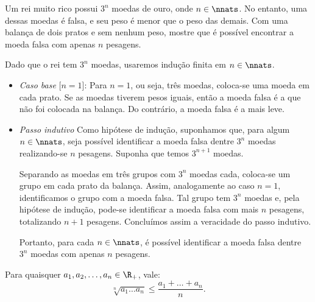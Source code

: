 \begin{example}
Um rei muito rico possui $3^n$ moedas de ouro, onde $n \in \nnats$. No entanto, uma dessas moedas é falsa, e seu peso é menor que o peso das demais. Com uma balança de dois pratos e sem nenhum peso, mostre que é possível encontrar a moeda falsa com apenas $n$ pesagens.
\end{example}

\begin{solution}
Dado que o rei tem $3^n$ moedas, usaremos indução finita em $n \in \nnats$. 

\begin{itemize}
	\item \textit{Caso base} [$n=1$]: Para $n=1$, ou seja, três moedas, coloca-se uma moeda em cada prato. Se as moedas tiverem pesos iguais, então a moeda falsa é a que não foi colocada na balança. Do contrário, a moeda falsa é a mais leve.

	\item \textit{Passo indutivo} Como hipótese de indução, suponhamos que, para algum $n \in \nnats$, seja possível identificar a moeda falsa dentre $3^n$ moedas realizando-se $n$ pesagens. Suponha que temos $3^{n+1}$ moedas. 

	Separando as moedas em três grupos com $3^n$ moedas cada, coloca-se um grupo em cada prato da balança. Assim, analogamente ao caso $n = 1$, identificamos o grupo com a moeda falsa. Tal grupo tem $3^n$ moedas e, pela hipótese de indução, pode-se identificar a moeda falsa com mais $n$  pesagens, totalizando $n+1$ pesagens. Concluímos assim a veracidade do passo indutivo.

		Portanto, para cada $n \in \nnats$, é possível identificar a moeda falsa dentre $3^n$ moedas com apenas $n$ pesagens.
\end{itemize}
\end{solution}

\begin{theorem}
Para quaisquer $a_1, a_2, \dots , a_n \in \R_+$, vale:
%
\begin{equation*}
    \sqrt[n]{a_1\dots a_n} \le \frac {a_1 + \dots + a_n} n.
\end{equation*}
\end{theorem}

